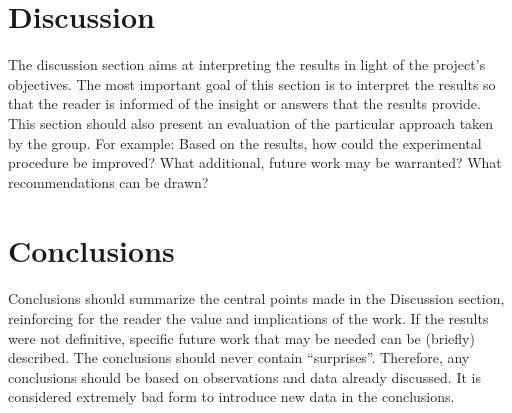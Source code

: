 \begin{table}[ht!]
\centering
\caption{}
\label{tab:my-table}
\end{table}


\section{Discussion}
The discussion section aims at interpreting the results in light of the project's objectives. The most important goal of this section is to interpret the results so that the reader is informed of the insight or answers that the results provide. This section should also present an evaluation of the particular approach taken by the group. For example: Based on the results, how could the experimental procedure be improved? What additional, future work may be warranted? What recommendations can be drawn?


\section{Conclusions}
Conclusions should summarize the central points made in the Discussion section, reinforcing for the reader the value and implications of the work. If the results were not definitive, specific future work that may be needed can be (briefly) described. The conclusions should never contain ``surprises''. Therefore, any conclusions should be based on observations and data already discussed. It is considered extremely bad form to introduce new data in the conclusions.













